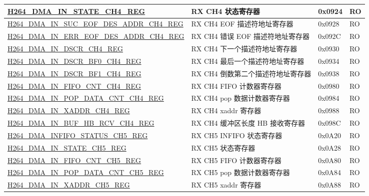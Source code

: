 \begin{longtable}{ | p{7.5cm} | p{5.7cm} | p{1.2cm} | p{1.5cm} | }
    \hyperref[regdesc:H264DMAINSTATECH4REG]{H264\_DMA\_IN\_STATE\_CH4\_REG} & RX CH4 状态寄存器 & 0x0924 & RO \\ \hline
    \hyperref[regdesc:H264DMAINSUCEOFDESADDRCH4REG]{H264\_DMA\_IN\_SUC\_EOF\_DES\_ADDR\_CH4\_REG} & RX CH4 EOF 描述符地址寄存器 & 0x0928 & RO \\ \hline
    \hyperref[regdesc:H264DMAINERREOFDESADDRCH4REG]{H264\_DMA\_IN\_ERR\_EOF\_DES\_ADDR\_CH4\_REG} & RX CH4 错误 EOF 描述符地址寄存器 & 0x092C & RO \\ \hline
    \hyperref[regdesc:H264DMAINDSCRCH4REG]{H264\_DMA\_IN\_DSCR\_CH4\_REG} & RX CH4 下一个描述符地址寄存器 & 0x0930 & RO \\ \hline
    \hyperref[regdesc:H264DMAINDSCRBF0CH4REG]{H264\_DMA\_IN\_DSCR\_BF0\_CH4\_REG} & RX CH4 最后一个描述符地址寄存器 & 0x0934 & RO \\ \hline
    \hyperref[regdesc:H264DMAINDSCRBF1CH4REG]{H264\_DMA\_IN\_DSCR\_BF1\_CH4\_REG} & RX CH4 倒数第二个描述符地址寄存器 & 0x0938 & RO \\ \hline
    \hyperref[regdesc:H264DMAINFIFOCNTCH4REG]{H264\_DMA\_IN\_FIFO\_CNT\_CH4\_REG} & RX CH4 FIFO 计数器寄存器 & 0x0980 & RO \\ \hline
    \hyperref[regdesc:H264DMAINPOPDATACNTCH4REG]{H264\_DMA\_IN\_POP\_DATA\_CNT\_CH4\_REG} & RX CH4 pop 数据计数器寄存器 & 0x0984 & RO \\ \hline
    \hyperref[regdesc:H264DMAINXADDRCH4REG]{H264\_DMA\_IN\_XADDR\_CH4\_REG} & RX CH4 xaddr 寄存器 & 0x0988 & RO \\ \hline
    \hyperref[regdesc:H264DMAINBUFHBRCVCH4REG]{H264\_DMA\_IN\_BUF\_HB\_RCV\_CH4\_REG} & RX CH4  缓冲区长度 HB 接收寄存器 & 0x098C & RO \\ \hline
    \hyperref[regdesc:H264DMAINFIFOSTATUSCH5REG]{H264\_DMA\_INFIFO\_STATUS\_CH5\_REG} & RX CH5 INFIFO 状态寄存器 & 0x0A20 & RO \\ \hline
    \hyperref[regdesc:H264DMAINSTATECH5REG]{H264\_DMA\_IN\_STATE\_CH5\_REG} & RX CH5 状态寄存器 & 0x0A28 & RO \\ \hline
    \hyperref[regdesc:H264DMAINFIFOCNTCH5REG]{H264\_DMA\_IN\_FIFO\_CNT\_CH5\_REG} & RX CH5 FIFO 计数器寄存器 & 0x0A80 & RO \\ \hline
    \hyperref[regdesc:H264DMAINPOPDATACNTCH5REG]{H264\_DMA\_IN\_POP\_DATA\_CNT\_CH5\_REG} & RX CH5 pop 数据计数器寄存器 & 0x0A84 & RO \\ \hline
    \hyperref[regdesc:H264DMAINXADDRCH5REG]{H264\_DMA\_IN\_XADDR\_CH5\_REG} & RX CH5 xaddr 寄存器 & 0x0A88 & RO \\ \hline

\end{longtable}
